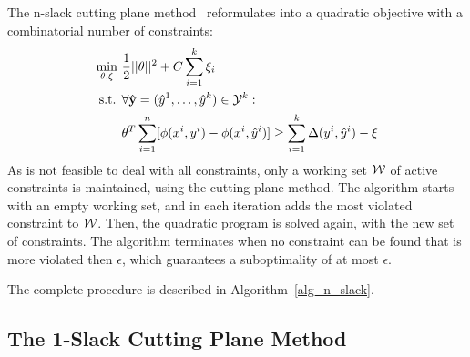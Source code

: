 The n-slack cutting plane method~\citep{tsochantaridis2006large} reformulates 
into a quadratic objective with a combinatorial number of constraints:
\begin{align}\label{eq:oneslack}
    \min_{\theta, \xi}\ &\frac{1}{2} ||\theta||^2 + C \sum_{i=1}^k \xi_i\\
    \text{s.t. }&\forall \hat{\mathbf{y}}=(\hat{y}^{1}, \dots, \hat{y}^{k}) \in \mathcal{Y}^k:\\
    &\theta^T \sum_{i=1}^n [\phi(x^{i}, y^{i}) - \phi(x^{i},
        \hat{y}^{i})] \geq \sum_{i=1}^k \Delta(y^{i}, \hat{y}^{i})
            - \xi
\end{align}
As is not feasible to deal with all constraints, only a working set $\mathcal{W}$ of active constraints
is maintained, using the cutting plane method. The algorithm starts with an empty working set,
and in each iteration adds the most violated constraint to $\mathcal{W}$. Then, the quadratic program is solved
again, with the new set of constraints.
The algorithm terminates when no constraint can be found that is more violated then $\epsilon$,
which guarantees a suboptimality of at most $\epsilon$.

The complete procedure is described in Algorithm~\ref{alg_n_slack}.

\subsection{The 1-Slack Cutting Plane Method}

